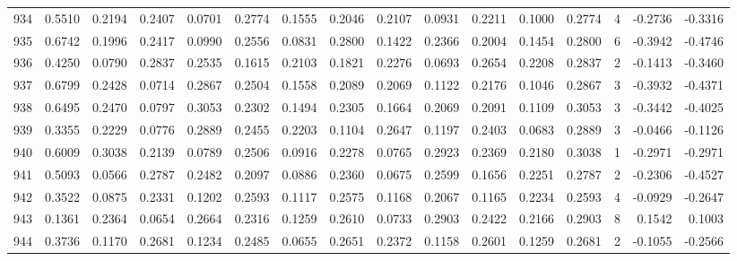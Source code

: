\begin{tabular}{lrrrrrrrrrrrrrrr}
934 &      0.5510 &  0.2194 &  0.2407 &  0.0701 &  0.2774 &  0.1555 &  0.2046 &  0.2107 &  0.0931 &  0.2211 &   0.1000 &     0.2774 &      4 &                   -0.2736 &                    -0.3316 \\
935 &      0.6742 &  0.1996 &  0.2417 &  0.0990 &  0.2556 &  0.0831 &  0.2800 &  0.1422 &  0.2366 &  0.2004 &   0.1454 &     0.2800 &      6 &                   -0.3942 &                    -0.4746 \\
936 &      0.4250 &  0.0790 &  0.2837 &  0.2535 &  0.1615 &  0.2103 &  0.1821 &  0.2276 &  0.0693 &  0.2654 &   0.2208 &     0.2837 &      2 &                   -0.1413 &                    -0.3460 \\
937 &      0.6799 &  0.2428 &  0.0714 &  0.2867 &  0.2504 &  0.1558 &  0.2089 &  0.2069 &  0.1122 &  0.2176 &   0.1046 &     0.2867 &      3 &                   -0.3932 &                    -0.4371 \\
938 &      0.6495 &  0.2470 &  0.0797 &  0.3053 &  0.2302 &  0.1494 &  0.2305 &  0.1664 &  0.2069 &  0.2091 &   0.1109 &     0.3053 &      3 &                   -0.3442 &                    -0.4025 \\
939 &      0.3355 &  0.2229 &  0.0776 &  0.2889 &  0.2455 &  0.2203 &  0.1104 &  0.2647 &  0.1197 &  0.2403 &   0.0683 &     0.2889 &      3 &                   -0.0466 &                    -0.1126 \\
940 &      0.6009 &  0.3038 &  0.2139 &  0.0789 &  0.2506 &  0.0916 &  0.2278 &  0.0765 &  0.2923 &  0.2369 &   0.2180 &     0.3038 &      1 &                   -0.2971 &                    -0.2971 \\
941 &      0.5093 &  0.0566 &  0.2787 &  0.2482 &  0.2097 &  0.0886 &  0.2360 &  0.0675 &  0.2599 &  0.1656 &   0.2251 &     0.2787 &      2 &                   -0.2306 &                    -0.4527 \\
942 &      0.3522 &  0.0875 &  0.2331 &  0.1202 &  0.2593 &  0.1117 &  0.2575 &  0.1168 &  0.2067 &  0.1165 &   0.2234 &     0.2593 &      4 &                   -0.0929 &                    -0.2647 \\
943 &      0.1361 &  0.2364 &  0.0654 &  0.2664 &  0.2316 &  0.1259 &  0.2610 &  0.0733 &  0.2903 &  0.2422 &   0.2166 &     0.2903 &      8 &                    0.1542 &                     0.1003 \\
944 &      0.3736 &  0.1170 &  0.2681 &  0.1234 &  0.2485 &  0.0655 &  0.2651 &  0.2372 &  0.1158 &  0.2601 &   0.1259 &     0.2681 &      2 &                   -0.1055 &                    -0.2566 \\

\end{tabular}
